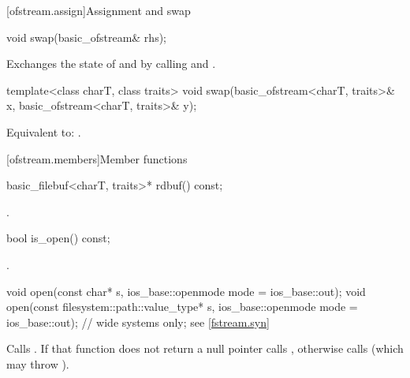 [ofstream.assign]{Assignment and swap}

%
\begin{itemdecl}
void swap(basic_ofstream& rhs);
\end{itemdecl}

\begin{itemdescr}
\pnum
\effects
Exchanges the state of 
and  by calling
 and
.
\end{itemdescr}

%
\begin{itemdecl}
template<class charT, class traits>
  void swap(basic_ofstream<charT, traits>& x,
            basic_ofstream<charT, traits>& y);
\end{itemdecl}

\begin{itemdescr}
\pnum
\effects
Equivalent to: .
\end{itemdescr}

[ofstream.members]{Member functions}

%
\begin{itemdecl}
basic_filebuf<charT, traits>* rdbuf() const;
\end{itemdecl}

\begin{itemdescr}
\pnum
\returns
{}.
\end{itemdescr}

%
\begin{itemdecl}
bool is_open() const;
\end{itemdecl}

\begin{itemdescr}
\pnum
\returns
{}.
\end{itemdescr}

%
\begin{itemdecl}
void open(const char* s, ios_base::openmode mode = ios_base::out);
void open(const filesystem::path::value_type* s,
          ios_base::openmode mode = ios_base::out);             // wide systems only; see \ref{fstream.syn}
\end{itemdecl}

\begin{itemdescr}
\pnum
\effects
Calls
.
If that function does not return a null pointer
calls ,
otherwise calls
(which may throw
).
\end{itemdescr}

